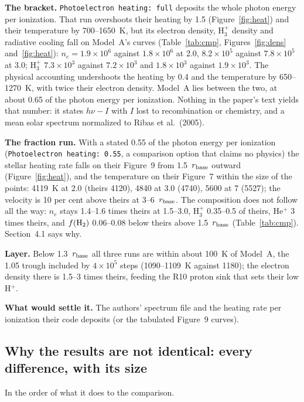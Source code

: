 \documentclass[english,a4paper]{my_memo}
\begin{document}
\textbf{The bracket.} \texttt{Photoelectron heating: full} deposits the
whole photon energy per ionization. That run overshoots their heating by
1.5 (Figure~\ref{fig:heat}) and their temperature by 700--1650~K, but its
electron density, H$_3^+$ density and radiative cooling fall on Model~A's
curves (Table~\ref{tab:cmp}, Figures~\ref{fig:dens} and~\ref{fig:heat}):
$n_e = 1.9\times10^6$ against $1.8\times10^6$ at 2.0, $8.2\times10^5$
against $7.8\times10^5$ at 3.0; H$_3^+$ $7.3\times10^3$ against
$7.2\times10^3$ and $1.8\times10^3$ against $1.9\times10^3$. The physical
accounting undershoots the heating by 0.4 and the temperature by
650--1270~K, with twice their electron density. Model~A lies between the
two, at about 0.65 of the photon energy per ionization. Nothing in the
paper's text yields that number: it states $h\nu - I$ with $I$ lost to
recombination or chemistry, and a mean solar spectrum normalized to Ribas
et al.\ (2005).

\textbf{The fraction run.} With a stated 0.55 of the photon energy per
ionization (\texttt{Photoelectron heating: 0.55}, a comparison option that
claims no physics) the stellar heating rate falls on their Figure~9 from
1.5~$r_{\rm base}$ outward (Figure~\ref{fig:heat}), and the temperature on
their Figure~7 within the size of the points: 4119~K at 2.0 (theirs 4120),
4840 at 3.0 (4740), 5600 at 7 (5527); the velocity is 10 per cent above
theirs at 3--6~$r_{\rm base}$. The composition does not follow all the way:
$n_e$ stays 1.4--1.6 times theirs at 1.5--3.0, H$_3^+$ 0.35--0.5 of theirs,
He$^+$ 3 times theirs, and $f({\rm H}_2)$ 0.06--0.08 below theirs above
1.5~$r_{\rm base}$ (Table~\ref{tab:cmp}). Section~4.1 says why.

\textbf{Layer.} Below 1.3~$r_{\rm base}$ all three runs are within about
100~K of Model~A, the 1.05 trough included by $4\times10^5$ steps (1090--1109~K
against 1180); the electron density there is 1.5--3 times theirs, feeding
the R10 proton sink that sets their low H$^+$.

\textbf{What would settle it.} The authors' spectrum file and the heating
rate per ionization their code deposits (or the tabulated Figure~9 curves).

\subsection{Why the results are not identical: every difference, with its size}
\label{sec:diffs}

In the order of what it does to the comparison.
\end{document}
